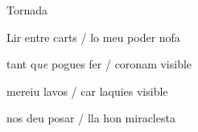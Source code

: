\documentclass[12pt]{article}
\begin{document}
\begin{estrofaExtra}%




\begin{tornada}

Tornada

\end{tornada}


\end{estrofaExtra}


\begin{estrofa}

 Lir entre carts / lo meu poder nofa

 tant q\textit{ue} pogues fer / coronam visible

 mereiu lavos / car laquies visible

 nos deu posar / lla hon miraclesta

\end{estrofa}
\end{document}

